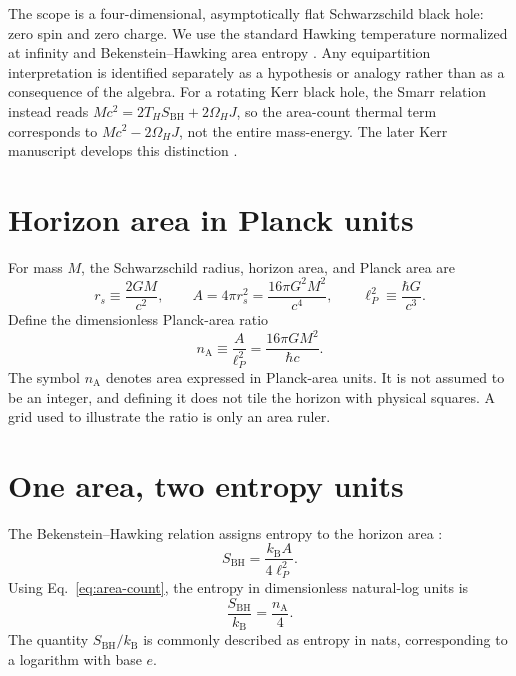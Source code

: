 \documentclass[12pt]{article}
\begin{document}
The scope is a four-dimensional, asymptotically flat Schwarzschild black hole: zero spin and zero charge. We use the standard Hawking temperature normalized at infinity and Bekenstein--Hawking area entropy \cite{Bekenstein,Hawking,Smarr}. Any equipartition interpretation is identified separately as a hypothesis or analogy rather than as a consequence of the algebra. For a rotating Kerr black hole, the Smarr relation instead reads $Mc^2=2T_HS_{\mathrm{BH}}+2\Omega_HJ$, so the area-count thermal term corresponds to $Mc^2-2\Omega_HJ$, not the entire mass-energy. The later Kerr manuscript develops this distinction \cite{Smarr}.

\section{Horizon area in Planck units}

For mass $M$, the Schwarzschild radius, horizon area, and Planck area are
\begin{equation}
  r_s\equiv\frac{2GM}{c^2},
  \qquad
  A=4\pi r_s^2=\frac{16\pi G^2M^2}{c^4},
  \qquad
  \ell_P^2\equiv\frac{\hbar G}{c^3}.
  \label{eq:area-and-planck-area}
\end{equation}
Define the dimensionless Planck-area ratio
\begin{equation}
  n_{\mathrm A}\equiv\frac{A}{\ell_P^2}
  =\frac{16\pi G M^2}{\hbar c}.
  \label{eq:area-count}
\end{equation}
The symbol $n_{\mathrm A}$ denotes area expressed in Planck-area units. It is not assumed to be an integer, and defining it does not tile the horizon with physical squares. A grid used to illustrate the ratio is only an area ruler.

\section{One area, two entropy units}

The Bekenstein--Hawking relation assigns entropy to the horizon area \cite{Bekenstein,Hawking}:
\begin{equation}
  S_{\mathrm{BH}}=\frac{k_{\mathrm B}A}{4\ell_P^2}.
  \label{eq:bh-area-law}
\end{equation}
Using Eq.~\eqref{eq:area-count}, the entropy in dimensionless natural-log units is
\begin{equation}
  \frac{S_{\mathrm{BH}}}{k_{\mathrm B}}
  =\frac{n_{\mathrm A}}{4}.
  \label{eq:entropy-nats}
\end{equation}
The quantity $S_{\mathrm{BH}}/k_{\mathrm B}$ is commonly described as entropy in nats, corresponding to a logarithm with base $e$.
\end{document}

